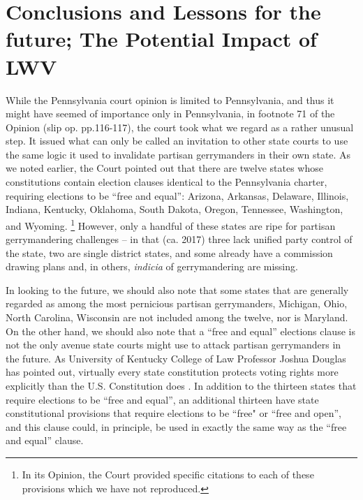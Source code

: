 \section{Conclusions and Lessons for the future; The Potential Impact of LWV}
    While the Pennsylvania court opinion is limited to Pennsylvania, and thus it might have seemed of importance only in Pennsylvania, in footnote 71 of the Opinion (slip op. pp.116-117), the court took what we regard as a rather unusual step. It issued what can only be called an invitation to other state courts to use the same logic it used to invalidate partisan gerrymanders in their own state. As we noted earlier, the Court pointed out that there are twelve states whose constitutions contain election clauses identical to the Pennsylvania charter, requiring elections to be “free and equal”: Arizona, Arkansas, Delaware, Illinois, Indiana, Kentucky, Oklahoma, South Dakota, Oregon, Tennessee, Washington, and Wyoming.
        \footnote{In its Opinion, the Court provided specific citations to each of these provisions which we have not reproduced.}
    However, only a handful of these states are ripe for partisan gerrymandering challenges -- in that (ca. 2017) three lack unified party control of the state, two are single district states, and some already have a commission drawing plans and, in others, \textit{indicia} of gerrymandering are missing.
\par
    In looking to the future, we should also note that some states that are generally regarded as among the most pernicious partisan gerrymanders, Michigan, Ohio, North Carolina, Wisconsin are not included among the twelve, nor is Maryland. On the other hand, we should also note that a “free and equal” elections clause is not the only avenue state courts might use to attack partisan gerrymanders in the future. As University of Kentucky College of Law Professor Joshua Douglas has pointed out, virtually every state constitution protects voting rights more explicitly than the U.S. Constitution does \citep{Douglas2014_RightToVote}. In addition to the thirteen states that require elections to be ``free and equal”, an additional thirteen have state constitutional provisions that require elections to be ``free" or ``free and open”, and this clause could, in principle, be used in exactly the same way as the ``free and equal” clause. 
